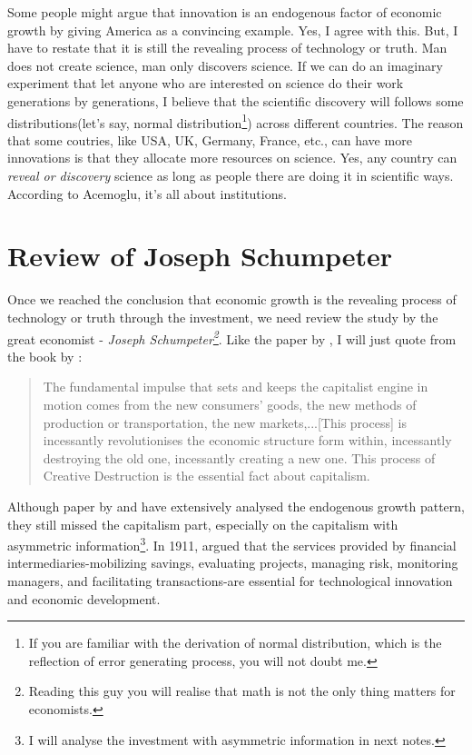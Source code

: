 \documentclass[12pt]{article}
\theoremstyle{definition}
\numberwithin{equation}{section}
\numberwithin{figure}{section}
\numberwithin{table}{section}
\begin{document}
Some people might argue that innovation is an endogenous factor of economic growth by giving America as a convincing example. Yes, I agree with this. But, I have to restate that it is still the revealing process of technology or truth. Man does not create science, man only discovers science. If we can do an imaginary experiment that let anyone who are interested on science do their work generations by generations, I believe that the scientific discovery will follows some distributions(let's say, normal distribution\footnote{If you are familiar with the derivation of normal distribution, which is the reflection of error generating process, you will not doubt me.}) across different countries. The reason that some coutries, like USA, UK, Germany, France, etc., can have more innovations is that they allocate more resources on science. Yes, any country can \textit{reveal or discovery} science as long as people there are doing it in scientific ways. According to Acemoglu, it's all about institutions.

\section{Review of Joseph Schumpeter}

Once we reached the conclusion that economic growth is the revealing process of technology or truth through the investment, we need review the study by the great economist - \textit{Joseph Schumpeter\footnote{Reading this guy you will realise that math is not the only thing matters for economists.}}. Like the paper by \cite{aghion1990model}, I will just quote from the book by \cite{schumpeter2010capitalism}:
\begin{quotation}
 The fundamental impulse that sets and keeps the capitalist engine in motion comes from the new consumers' goods, the new methods of production or transportation, the new markets,...[This process] is incessantly revolutionises the economic structure form within, incessantly destroying the old one, incessantly creating a new one. This process of Creative Destruction is the essential fact about capitalism.
\end{quotation}

Although paper by \cite{romer1990endogenous} and \cite{aghion1990model} have extensively analysed the endogenous growth pattern, they still missed the capitalism part, especially on the capitalism with asymmetric information\footnote{I will analyse the investment with asymmetric information in next notes.}. In 1911, \citeauthor{schumpeter2017theory} argued that the services provided by financial intermediaries-mobilizing savings, evaluating projects, managing risk, monitoring managers, and facilitating transactions-are essential for technological innovation and economic development.
\end{document}

